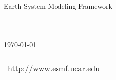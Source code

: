 %


\begin{titlepage}

\begin{center}
{\Large Earth System Modeling Framework } \\
\vspace{.25in}
{\Large {\bf \mytitle}} \\
\vspace{.25in}
{\large {\bf \myversion}} \\
\vspace{.5in}
{\large {\it \myauthors}} \\
\vspace{.25in}
{\large {\today}}
\vspace{.25in}
\end{center}

\begin{latexonly}
\vspace{4.5in}
\begin{tabular}{p{5in}p{.9in}}
\hrulefill \\
\noindent http://www.esmf.ucar.edu \\
\end{tabular}
\end{latexonly}

\end{titlepage}














